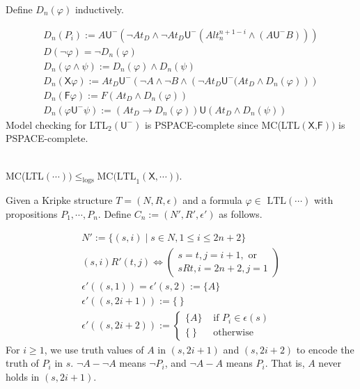 \documentclass[12pt]{article}
\begin{document}
\begin{CJK*}{GBK}{song}
Define $D_n(\varphi)$ inductively. 

$$\begin{array}{l}
D_n(P_i):=A\textsf{U}^-\left(\neg At_D\wedge \neg At_D\textsf{U}^-\left(Alt^{n+1-i}_n\wedge (A\textsf{U}^-B)\right)\right)\\
D(\neg \varphi)=\neg D_n(\varphi)\\
D_n(\varphi\wedge\psi):=D_n(\varphi)\wedge D_n(\psi)\\
D_n(\textsf{X}\varphi):=At_D\textsf{U}^-\left(\neg A\wedge\neg B\wedge\left(
\neg At_D\textsf{U}^-(At_D\wedge D_n(\varphi)\right)\right)\\
D_n(\textsf{F}\varphi):=F(At_D\wedge D_n(\varphi))\\
D_n(\varphi\textsf{U}^-\psi):=(At_D\rightarrow D_n(\varphi))\textsf{U}(At_D\wedge D_n(\psi))
\end{array}$$
%
\color{red} Model checking for LTL$_2(\textsf{U}^-)$ is PSPACE-complete since MC(LTL$(\textsf{X,F}))$ is PSPACE-complete. 
\color{black}

\ \\

MC(LTL$(\cdots))\leq_{\text{logs}} \mbox{MC(LTL}_1(\textsf{X},\cdots))$. 


Given a Kripke structure $T=(N,R,\epsilon)$ and a formula $\varphi\in \mbox{ LTL}(\cdots)$ with propositions $P_1,\cdots, P_n$. Define $C_n:=(N',R',\epsilon')$ as follows.

$$\begin{array}{l}
N':=\{(s,i)\mid s\in N, 1\leq i\leq 2n+2\}\\

(s,i)R'(t,j) \Longleftrightarrow \left(\begin{array}{l} s=t, j=i+1, \mbox{ or}\\
                                 sRt, i=2n+2, j=1 
\end{array}\right)\\

\epsilon'((s,1))=\epsilon'(s,2):=\{A\}\\

\epsilon'((s,2i+1)):=\{ \ \}\\

\epsilon'((s,2i+2)):=\left\{\begin{array}{ll}
\{A\} & \mbox{ if }P_i\in \epsilon(s)\\
\{\ \} & \mbox{ otherwise }  
\end{array}\right.
\end{array}
$$
%
For $i\geq 1$, we use truth values of $A$ in $(s,2i+1)$ and $(s,2i+2)$ to encode the truth of $P_i$ in $s$. $\neg A-\neg A$ means $\neg P_i$, and $\neg A-A$ means $P_i$. That is, $A$ never holds in $(s,2i+1)$. 


\end{CJK*}
\end{document}

